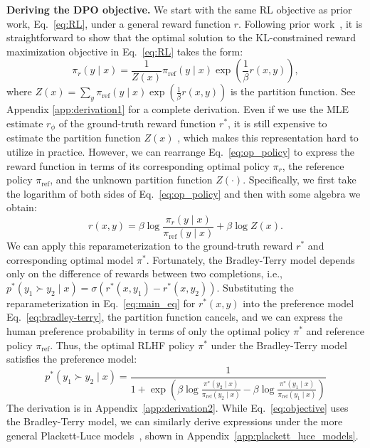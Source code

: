 \documentclass{article}
\newcommand{\piref}{\pi_\text{ref}}
\begin{document}
\textbf{Deriving the DPO objective.} We start with the same RL objective as prior work, Eq.~\ref{eq:RL}, under a general reward function $r$. Following prior work~\citep{peters2007reinforcement, peng2019advantage, korbak2022reinforcement, go2023aligning}, it is straightforward to show that the optimal solution to the KL-constrained reward maximization objective in Eq.~\ref{eq:RL} takes the form:
\begin{equation}\label{eq:op_policy}
    \pi_r(y\mid x) = \frac{1}{Z(x)}\piref(y\mid x)\exp\left(\frac{1}{\beta}r(x, y)\right),
\end{equation}%
where $Z(x) =\sum_{y}\piref(y\mid x)\exp\left(\frac{1}{\beta}r(x, y)\right)$ is the partition function. See Appendix \ref{app:derivation1} for a complete derivation. Even if we use the MLE estimate $r_{\phi}$ of the ground-truth reward function $r^*$, it is still expensive to estimate the partition function $Z(x)$ \citep{korbak2022reinforcement, go2023aligning}, which makes this representation hard to utilize in practice. However, we can rearrange Eq.~\ref{eq:op_policy} to express the reward function in terms of its corresponding optimal policy $\pi_r$, the reference policy $\piref$, and the unknown partition function $Z(\cdot)$. Specifically, we first take the logarithm of both sides of Eq.~\ref{eq:op_policy} and then with some algebra we obtain:
\begin{equation}\label{eq:main_eq}
    r(x,y) =\beta \log \frac{\pi_r(y\mid x)}{\piref(y\mid x)} + \beta \log Z(x).
\end{equation}
We can apply this reparameterization to the ground-truth reward $r^*$ and corresponding optimal model $\pi^*$. Fortunately, the Bradley-Terry model depends only on the difference of rewards between two completions, i.e., ${p^*(y_1 \succ y_2 \mid x) = \sigma(r^*(x, y_1) - r^*(x, y_2))}$. Substituting the reparameterization in Eq.~\ref{eq:main_eq} for $r^*(x,y)$ into the preference model Eq.~\ref{eq:bradley-terry}, the partition function cancels, and we can express the human preference probability in terms of only the optimal policy $\pi^*$ and reference policy $\piref$. Thus, the optimal RLHF policy $\pi^*$ under the Bradley-Terry model satisfies the preference model:
\begin{equation}\label{eq:objective}
    p^*(y_1\succ y_2 \mid x)=\frac{1}{1 + \exp\left(\beta \log \frac{\pi^*(y_2\mid x)}{\piref(y_2\mid x)} - \beta \log \frac{\pi^*(y_1\mid x)}{\piref(y_1\mid x)}\right)}
\end{equation}
The derivation is in Appendix~\ref{app:derivation2}. While Eq.~\ref{eq:objective} uses the Bradley-Terry model, we can similarly derive expressions under the more general Plackett-Luce models~\citep{plackett1975analysis, luce2012individual}, shown in Appendix~\ref{app:plackett_luce_models}.
\end{document}
